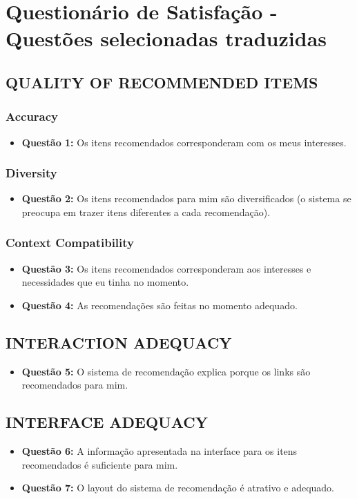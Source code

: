 \chapter{Questionário de Satisfação - Questões selecionadas traduzidas}\label{ape:questionario-de-satisfacao}

\section{QUALITY OF RECOMMENDED ITEMS}
\subsection{Accuracy}
\begin{itemize}
\item \textbf{Questão 1:} Os itens recomendados corresponderam com os meus interesses.
\end{itemize}
\subsection{Diversity}
\begin{itemize}
\item \textbf{Questão 2:} Os itens recomendados para mim são diversificados (o sistema se preocupa em trazer itens diferentes a cada recomendação).
\end{itemize}
\subsection{Context Compatibility}
\begin{itemize}
\item \textbf{Questão 3:} Os itens recomendados corresponderam aos  interesses e necessidades que eu tinha no momento.
\item \textbf{Questão 4:} As recomendações são feitas no momento adequado.
\end{itemize}
\section{INTERACTION ADEQUACY}
\begin{itemize}
\item \textbf{Questão 5:} O sistema de recomendação explica porque os links são recomendados para mim.
\end{itemize}
\section{INTERFACE ADEQUACY}
\begin{itemize}
\item \textbf{Questão 6:} A informação apresentada na interface para os itens recomendados é suficiente para mim.
\item \textbf{Questão 7:} O layout do sistema de recomendação é atrativo e adequado.
\end{itemize}
